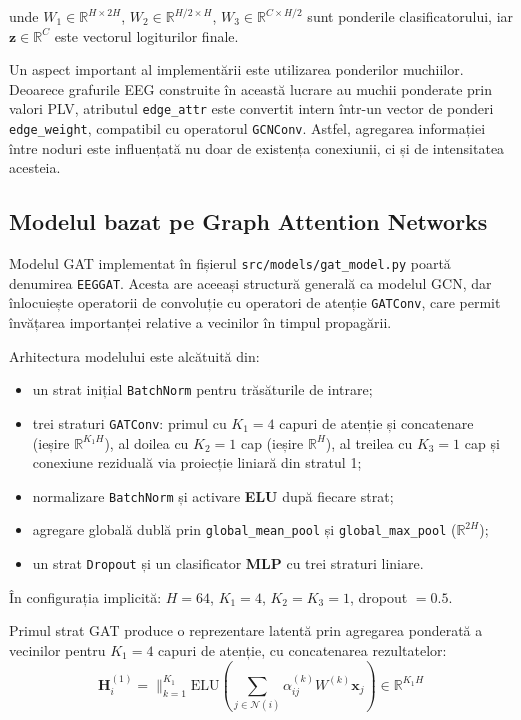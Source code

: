 \documentclass[12pt,a4paper]{report}
\theoremstyle{definition}
\theoremstyle{remark}
\begin{document}
\noindent unde $W_1 \in \mathbb{R}^{H \times 2H}$, $W_2 \in \mathbb{R}^{H/2 \times H}$, $W_3 \in \mathbb{R}^{C \times H/2}$ sunt ponderile clasificatorului, iar $\mathbf{z} \in \mathbb{R}^{C}$ este vectorul logiturilor finale.

Un aspect important al implementării este utilizarea ponderilor muchiilor. Deoarece grafurile EEG construite în această lucrare au muchii ponderate prin valori PLV, atributul \texttt{edge\_attr} este convertit intern într-un vector de ponderi \texttt{edge\_weight}, compatibil cu operatorul \texttt{GCNConv}. Astfel, agregarea informației între noduri este influențată nu doar de existența conexiunii, ci și de intensitatea acesteia.

\subsection{Modelul bazat pe Graph Attention Networks}

Modelul GAT implementat în fișierul \texttt{src/models/gat\_model.py} poartă denumirea \texttt{EEGGAT}. Acesta are aceeași structură generală ca modelul GCN, dar înlocuiește operatorii de convoluție cu operatori de atenție \texttt{GATConv}, care permit învățarea importanței relative a vecinilor în timpul propagării.

Arhitectura modelului este alcătuită din:
\begin{itemize}
    \item un strat inițial \texttt{BatchNorm} pentru trăsăturile de intrare;
    \item trei straturi \texttt{GATConv}: primul cu $K_1 = 4$ capuri de atenție și concatenare
          (ieșire $\mathbb{R}^{K_1 H}$), al doilea cu $K_2 = 1$ cap (ieșire $\mathbb{R}^{H}$),
          al treilea cu $K_3 = 1$ cap și conexiune reziduală via proiecție liniară din stratul 1;
    \item normalizare \texttt{BatchNorm} și activare \textbf{ELU} după fiecare strat;
    \item agregare globală dublă prin \texttt{global\_mean\_pool} și \texttt{global\_max\_pool}
          ($\mathbb{R}^{2H}$);
    \item un strat \texttt{Dropout} și un clasificator \textbf{MLP} cu trei straturi liniare.
\end{itemize}

În configurația implicită: $H = 64$, $K_1 = 4$, $K_2 = K_3 = 1$, dropout $= 0.5$.

Primul strat GAT produce o reprezentare latentă prin agregarea ponderată a vecinilor pentru $K_1 = 4$ capuri de atenție, cu concatenarea rezultatelor:
\begin{equation}
    \mathbf{H}^{(1)}_i = \Big\|_{k=1}^{K_1}
    \text{ELU}\!\left(
    \sum_{j \in \mathcal{N}(i)} \alpha_{ij}^{(k)} W^{(k)} \mathbf{x}_j
    \right) \in \mathbb{R}^{K_1 H}
    \label{eq:gat_layer1_impl}
\end{equation}
\end{document}
